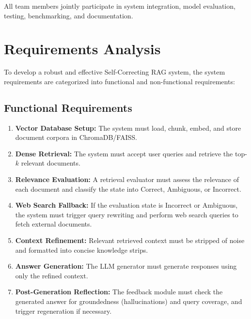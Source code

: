 \documentclass[12pt,a4paper]{article}
\begin{document}
All team members jointly participate in system integration, model evaluation, testing, benchmarking, and documentation.

\newpage

\section{Requirements Analysis}
To develop a robust and effective Self-Correcting RAG system, the system requirements are categorized into functional and non-functional requirements:

\subsection{Functional Requirements}
\begin{enumerate}
    \item \textbf{Vector Database Setup:} The system must load, chunk, embed, and store document corpora in ChromaDB/FAISS.
    \item \textbf{Dense Retrieval:} The system must accept user queries and retrieve the top-$k$ relevant documents.
    \item \textbf{Relevance Evaluation:} A retrieval evaluator must assess the relevance of each document and classify the state into Correct, Ambiguous, or Incorrect.
    \item \textbf{Web Search Fallback:} If the evaluation state is Incorrect or Ambiguous, the system must trigger query rewriting and perform web search queries to fetch external documents.
    \item \textbf{Context Refinement:} Relevant retrieved context must be stripped of noise and formatted into concise knowledge strips.
    \item \textbf{Answer Generation:} The LLM generator must generate responses using only the refined context.
    \item \textbf{Post-Generation Reflection:} The feedback module must check the generated answer for groundedness (hallucinations) and query coverage, and trigger regeneration if necessary.
\end{enumerate}
\end{document}
